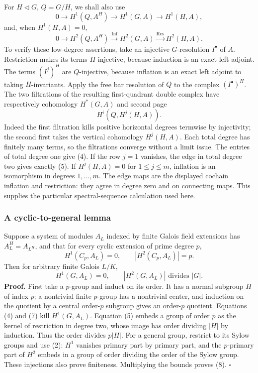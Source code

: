 \documentclass[11pt,a4paper]{article}
\begin{document}
For \(H\triangleleft G\), \(Q=G/H\), we shall also use \[
0\to H^1(Q,A^H)\to H^1(G,A)\to H^1(H,A),
\tag{4}
\] and, when \(H^1(H,A)=0\), \[
0\to H^2(Q,A^H)\xrightarrow{\mathrm{Inf}}H^2(G,A)
\xrightarrow{\mathrm{Res}}H^2(H,A).
\tag{5}
\] To verify these low-degree assertions, take an injective
\(G\)-resolution \(I^\bullet\) of \(A\). Restriction makes its terms
\(H\)-injective, because induction is an exact left adjoint. The terms
\((I^j)^H\) are \(Q\)-injective, because inflation is an exact left
adjoint to taking \(H\)-invariants. Apply the free bar resolution of
\(Q\) to the complex \((I^\bullet)^H\). The two filtrations of the
resulting first-quadrant double complex have respectively cohomology
\(H^*(G,A)\) and second page \[
H^i(Q,H^j(H,A)).
\tag{6}
\] Indeed the first filtration kills positive horizontal degrees
termwise by injectivity; the second first takes the vertical cohomology
\(H^j(H,A)\). Each total degree has finitely many terms, so the
filtrations converge without a limit issue. The entries of total degree
one give (4). If the row \(j=1\) vanishes, the edge in total degree two
gives exactly (5). If \(H^j(H,A)=0\) for \(1\leq j\leq m\), inflation is
an isomorphism in degrees \(1,\ldots,m\). The edge maps are the
displayed cochain inflation and restriction: they agree in degree zero
and on connecting maps. This supplies the particular spectral-sequence
calculation used here.

\subsubsection{A cyclic-to-general
lemma}\label{a-cyclic-to-general-lemma}

Suppose a system of modules \(A_L\) indexed by finite Galois field
extensions has \(A_L^H=A_{L^H}\), and that for every cyclic extension of
prime degree \(p\), \[
H^1(C_p,A_L)=0,\qquad |H^2(C_p,A_L)|=p.
\tag{7}
\] Then for arbitrary finite Galois \(L/K\), \[
H^1(G,A_L)=0,\qquad |H^2(G,A_L)|\text{ divides }|G|.
\tag{8}
\] \textbf{Proof.} First take a \(p\)-group and induct on its order. It
has a normal subgroup \(H\) of index \(p\): a nontrivial finite
\(p\)-group has a nontrivial center, and induction on the quotient by a
central order-\(p\) subgroup gives an order-\(p\) quotient. Equations
(4) and (7) kill \(H^1(G,A_L)\). Equation (5) embeds a group of order
\(p\) as the kernel of restriction in degree two, whose image has order
dividing \(|H|\) by induction. Thus the order divides \(p|H|\). For a
general group, restrict to its Sylow groups and use (2): \(H^1\)
vanishes primary part by primary part, and the \(p\)-primary part of
\(H^2\) embeds in a group of order dividing the order of the Sylow
group. These injections also prove finiteness. Multiplying the bounds
proves (8). \(\square\)
\end{document}
